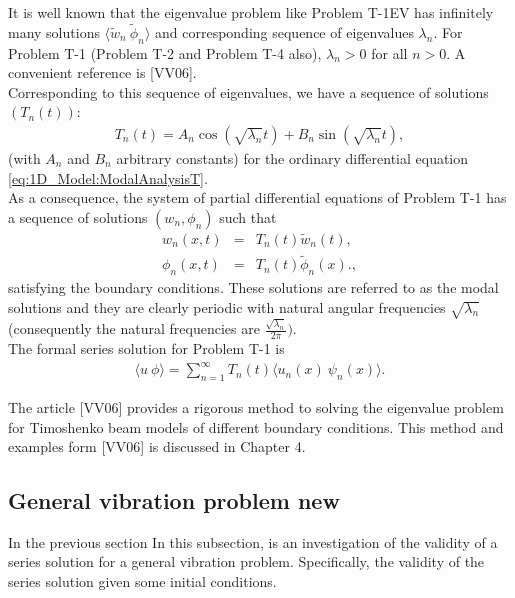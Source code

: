 \documentclass[../../main.tex]{subfiles}
\begin{document}
It is well known that the eigenvalue problem like Problem T-1EV has infinitely many solutions $\langle \tilde{w}_n \ \tilde{\phi}_n \rangle$ and corresponding sequence of eigenvalues $\lambda_n$. For Problem T-1 (Problem T-2 and Problem T-4 also), $\lambda_n > 0$ for all $n > 0$. A convenient reference is [VV06].\\

Corresponding to this sequence of eigenvalues, we have a sequence of solutions $(T_n(t))$:
\begin{eqnarray}
	T_n(t)=A_n\cos(\sqrt{\lambda_n}t)+B_n\sin(\sqrt{\lambda_n}t), \label{eq:1D_Model:ModalAnalysisTn}
\end{eqnarray}
(with $A_n$ and $B_n$ arbitrary constants) for the ordinary differential equation \eqref{eq:1D_Model:ModalAnalysisT}.\\


As a consequence, the system of partial differential equations of Problem T-1 has a sequence of solutions $(w_n,\phi_n)$ such that
\begin{eqnarray*}
	w_n(x,t) & = & T_n(t)\tilde{w}_n(t), \\
	\phi_n(x,t) & = & T_n(t)\tilde{\phi}_n(x).,
\end{eqnarray*} satisfying the boundary conditions. These solutions are referred to as the modal solutions and they are clearly periodic with natural angular frequencies $\sqrt{\lambda_n}$ (consequently the natural frequencies are $\frac{\sqrt{\lambda_n}}{2 \pi})$.\\

The formal series solution for Problem T-1 is
\begin{eqnarray*}
	\langle u \ \phi \rangle = \sum_{n=1}^{\infty} T_n(t)\langle u_n(x) \ \psi_n(x)\rangle.
\end{eqnarray*}

The article [VV06] provides a rigorous method to solving the eigenvalue problem for Timoshenko beam models of different boundary conditions. This method and examples form [VV06] is discussed in Chapter 4.

\subsection{General vibration problem new}
In the previous section In this subsection, is an investigation of the validity of a series solution for a general vibration problem. Specifically, the validity of the series solution given some initial conditions.\\
\end{document}
